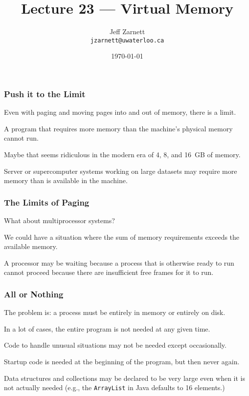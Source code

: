 

\title{Lecture 23 --- Virtual Memory}

\author{Jeff Zarnett \\ \small \texttt{jzarnett@uwaterloo.ca}}
\date{\today}




\begin{frame}
  \titlepage

 \end{frame}



\begin{frame}
\frametitle{Push it to the Limit}

Even with paging and moving pages into and out of memory, there is a limit. 

A program that requires more memory than the machine's physical memory cannot run. 

Maybe that seems ridiculous in the modern era of 4, 8, and 16~GB of memory. 

Server or supercomputer systems working on large datasets may require more memory than is available in the machine.

\end{frame}

\begin{frame}
\frametitle{The Limits of Paging}

What about multiprocessor systems?

We could have a situation where the sum of memory requirements exceeds the available memory. 

A processor may be waiting because a process that is otherwise ready to run cannot proceed because there are insufficient free frames for it to run.

\end{frame}

\begin{frame}
\frametitle{All or Nothing}

The problem is: a process must be entirely in memory or entirely on disk. 

In a lot of cases, the entire program is not needed at any given time. 

Code to handle unusual situations may not be needed except occasionally.

 Startup code is needed at the beginning of the program, but then never again. 
 
Data structures and collections may be declared to be very large even when it is not actually needed (e.g., the \texttt{ArrayList} in Java defaults to 16 elements.)

\end{frame}

